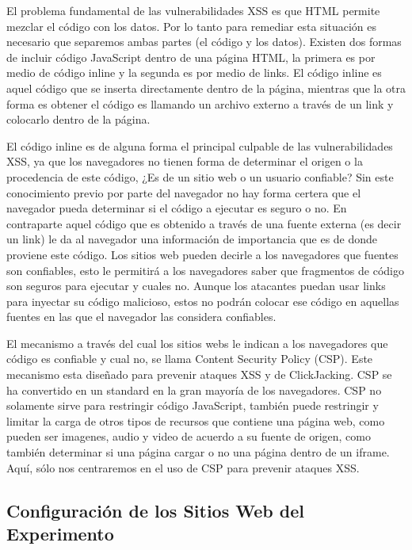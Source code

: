 El problema fundamental de las vulnerabilidades XSS es que HTML permite mezclar el código con los datos. Por lo tanto para remediar esta situación es necesario que separemos ambas partes (el código y los datos). Existen dos formas de incluir código JavaScript dentro de una página HTML, la primera es por medio de código inline y la segunda es por medio de links.
El código inline es aquel código que se inserta directamente dentro de la página, mientras que la otra forma es obtener el código es llamando un archivo externo a través de un link y colocarlo dentro de la página.

El código inline es de alguna forma el principal culpable de las vulnerabilidades XSS, ya que los navegadores no tienen forma de determinar el origen o la procedencia de este código, ¿Es de un sitio web o un usuario confiable? Sin este conocimiento previo por parte del navegador no hay forma certera que el navegador pueda determinar si el código a ejecutar es seguro o no.
En contraparte aquel código que es obtenido a través de una fuente externa (es decir un link) le da al navegador una información de importancia que es de donde proviene este código. Los sitios web pueden decirle a los navegadores que fuentes son confiables, esto le permitirá a los navegadores saber que fragmentos de código son seguros para ejecutar y cuales no. Aunque los atacantes puedan usar links para inyectar su código malicioso, estos no podrán colocar ese código en aquellas fuentes en las que el navegador las considera confiables.

El mecanismo a través del cual los sitios webs le indican a los navegadores que código es confiable y cual no, se llama Content Security Policy (CSP). 
Este mecanismo esta diseñado para prevenir ataques XSS y de ClickJacking.
CSP se ha convertido en un standard en la gran mayoría de los navegadores.
CSP no solamente sirve para restringir código JavaScript, también puede restringir y limitar la carga de otros tipos de recursos que contiene una página web, como pueden ser imagenes, audio y video de acuerdo a su fuente de origen, como también determinar si una página cargar o no una página dentro de un iframe. Aquí, sólo nos centraremos en el uso de CSP para prevenir ataques XSS.



\subsection{Configuración de los Sitios Web del Experimento} 

